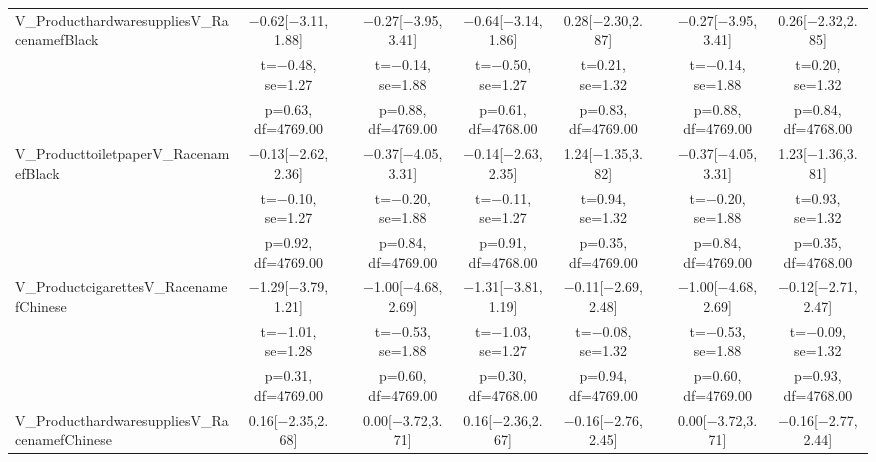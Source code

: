 \documentclass[]{report}
\begin{document}
\begin{table}
{\begin{tabular}[t]{lcccccccc}
		V\_ProducthardwaresuppliesV\_RacenamefBlack & \num{-0.62}[\num{-3.11},\num{1.88}] &  & \num{-0.27}[\num{-3.95},\num{3.41}] & \num{-0.64}[\num{-3.14},\num{1.86}] & \num{0.28}[\num{-2.30},\num{2.87}] &  & \num{-0.27}[\num{-3.95},\num{3.41}] & \num{0.26}[\num{-2.32},\num{2.85}]\\
		& t=\num{-0.48}, se=\num{1.27} &  & t=\num{-0.14}, se=\num{1.88} & t=\num{-0.50}, se=\num{1.27} & t=\num{0.21}, se=\num{1.32} &  & t=\num{-0.14}, se=\num{1.88} & t=\num{0.20}, se=\num{1.32}\\
		& p=\num{0.63}, df=\num{4769.00} &  & p=\num{0.88}, df=\num{4769.00} & p=\num{0.61}, df=\num{4768.00} & p=\num{0.83}, df=\num{4769.00} &  & p=\num{0.88}, df=\num{4769.00} & p=\num{0.84}, df=\num{4768.00}\\
		V\_ProducttoiletpaperV\_RacenamefBlack & \num{-0.13}[\num{-2.62},\num{2.36}] &  & \num{-0.37}[\num{-4.05},\num{3.31}] & \num{-0.14}[\num{-2.63},\num{2.35}] & \num{1.24}[\num{-1.35},\num{3.82}] &  & \num{-0.37}[\num{-4.05},\num{3.31}] & \num{1.23}[\num{-1.36},\num{3.81}]\\
		& t=\num{-0.10}, se=\num{1.27} &  & t=\num{-0.20}, se=\num{1.88} & t=\num{-0.11}, se=\num{1.27} & t=\num{0.94}, se=\num{1.32} &  & t=\num{-0.20}, se=\num{1.88} & t=\num{0.93}, se=\num{1.32}\\
		& p=\num{0.92}, df=\num{4769.00} &  & p=\num{0.84}, df=\num{4769.00} & p=\num{0.91}, df=\num{4768.00} & p=\num{0.35}, df=\num{4769.00} &  & p=\num{0.84}, df=\num{4769.00} & p=\num{0.35}, df=\num{4768.00}\\
		V\_ProductcigarettesV\_RacenamefChinese & \num{-1.29}[\num{-3.79},\num{1.21}] &  & \num{-1.00}[\num{-4.68},\num{2.69}] & \num{-1.31}[\num{-3.81},\num{1.19}] & \num{-0.11}[\num{-2.69},\num{2.48}] &  & \num{-1.00}[\num{-4.68},\num{2.69}] & \num{-0.12}[\num{-2.71},\num{2.47}]\\
		& t=\num{-1.01}, se=\num{1.28} &  & t=\num{-0.53}, se=\num{1.88} & t=\num{-1.03}, se=\num{1.27} & t=\num{-0.08}, se=\num{1.32} &  & t=\num{-0.53}, se=\num{1.88} & t=\num{-0.09}, se=\num{1.32}\\
		& p=\num{0.31}, df=\num{4769.00} &  & p=\num{0.60}, df=\num{4769.00} & p=\num{0.30}, df=\num{4768.00} & p=\num{0.94}, df=\num{4769.00} &  & p=\num{0.60}, df=\num{4769.00} & p=\num{0.93}, df=\num{4768.00}\\
		V\_ProducthardwaresuppliesV\_RacenamefChinese & \num{0.16}[\num{-2.35},\num{2.68}] &  & \num{0.00}[\num{-3.72},\num{3.71}] & \num{0.16}[\num{-2.36},\num{2.67}] & \num{-0.16}[\num{-2.76},\num{2.45}] &  & \num{0.00}[\num{-3.72},\num{3.71}] & \num{-0.16}[\num{-2.77},\num{2.44}]\\

\end{tabular}}
\end{table}
\end{document}
